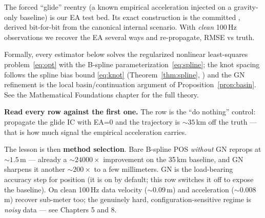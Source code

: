 The forced ``glide'' reentry (a known empirical acceleration injected on a
gravity-only baseline) is our EA test bed. Its exact construction is the
committed , derived bit-for-bit from the canonical
internal scenario. With \emph{clean} 100\,Hz observations we recover the EA
several ways and re-propagate, RMSE vs truth.

Formally, every estimator below solves the regularized nonlinear
least-squares problem~\eqref{eq:opt} with the B-spline
parameterization~\eqref{eq:spline}; the knot spacing follows the spline
bias bound \eqref{eq:knot} (Theorem~\ref{thm:spline},
\cite{deboor2001}) and the GN refinement is the local
basin/continuation argument of Proposition~\ref{prop:basin}. See the
Mathematical Foundations chapter for the full theory.


\textbf{Read every row against the first one.} The
 row is the ``do nothing'' control: propagate the
glide IC with EA=0 and the trajectory is ${\sim}35\,$km off the truth ---
that is how much signal the empirical acceleration carries.

The lesson is then \textbf{method selection}. Bare B-spline POS
\emph{without} GN reprops at ${\sim}1.5\,$m --- already a ${\sim}24000\times$
improvement on the 35\,km baseline, and GN sharpens it another
${\sim}200\times$ to a few millimeters. GN is the load-bearing accuracy step
for position (it is on by default; this row switches it off to expose the
baseline). On clean 100\,Hz data velocity (${\sim}0.09\,$m) and acceleration
(${\sim}0.008\,$m) recover sub-meter too; the genuinely hard,
configuration-sensitive regime is \emph{noisy} data --- see Chapters 5 and 8.
